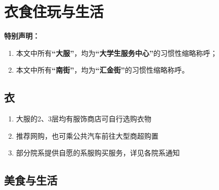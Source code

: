 \chapter[衣食住玩与生活]{衣食住玩与生活}
\noindent\textbf{特别声明：}
\begin{enumerate}
    \item 本文中所有\textbf{“大服”}，均为\textbf{“大学生服务中心”}的习惯性缩略称呼；
    \item 本文中所有\textbf{“南街”}，均为\textbf{“汇金街”}的习惯性缩略称呼。
\end{enumerate}
\section[衣]{衣}
\begin{enumerate}
    \item 大服的2、3层均有服饰商店可自行选购衣物
    \item 推荐网购，也可乘公共汽车前往大型商超购置
    \item 部分院系提供自愿的系服购买服务，详见各院系通知
\end{enumerate}

\section[美食与生活]{美食与生活\footnotemark[1]\footnotemark[2]\footnotemark[3]\footnotemark[4]\footnotemark[5]}

